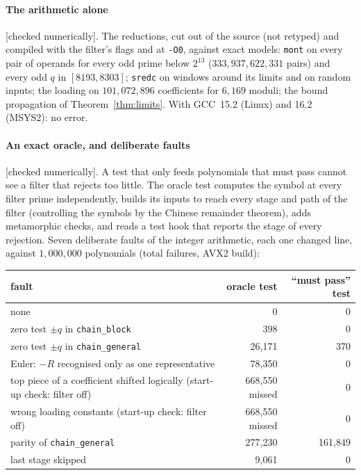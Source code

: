 \documentclass[10pt,a4paper]{article}
\newcommand{\code}[1]{\texttt{#1}}
\newcommand{\stnum}{\textsf{\small[checked numerically]}\xspace}
\theoremstyle{plain}
\theoremstyle{definition}
\begin{document}
\paragraph{The arithmetic alone} \stnum.  The reductions, cut out of the source (not retyped) and compiled with the filter's flags and at \code{-O0}, against exact
models: \code{mont} on every pair of operands for every odd prime below $2^{13}$ ($333{,}937{,}622{,}331$ pairs) and every odd $q$ in $[8193,8303]$; \code{sredc} on
windows around its limits and on random inputs; the loading on $101{,}072{,}896$ coefficients for $6{,}169$ moduli; the bound propagation of
Theorem~\ref{thm:limits}.  With GCC~15.2 (Linux) and 16.2 (MSYS2): no error.

\paragraph{An exact oracle, and deliberate faults} \stnum.  A test that only feeds polynomials that must pass cannot see a filter that rejects too little.  The
oracle test computes the symbol at every filter prime independently, builds its inputs to reach every stage and path of the filter (controlling the symbols by the
Chinese remainder theorem), adds metamorphic checks, and reads a test hook that reports the stage of every rejection.  Seven deliberate faults of the integer
arithmetic, each one changed line, against $1{,}000{,}000$ polynomials (total failures, AVX2 build):

\begin{center}\footnotesize
\begin{tabular}{@{}lrr@{}}
\toprule
fault & oracle test & ``must pass'' test \\ \midrule
none & 0 & 0 \\
zero test $\pm q$ in \code{chain\_block} & 398 & 0 \\
zero test $\pm q$ in \code{chain\_general} & 26,171 & 370 \\
Euler: $-R$ recognised only as one representative & 78,350 & 0 \\
top piece of a coefficient shifted logically (start-up check: filter off) & 668,550 missed & 0 \\
wrong loading constants (start-up check: filter off) & 668,550 missed & 0 \\
parity of \code{chain\_general} & 277,230 & 161,849 \\
last stage skipped & 9,061 & 0 \\
\bottomrule
\end{tabular}
\end{center}
\end{document}
